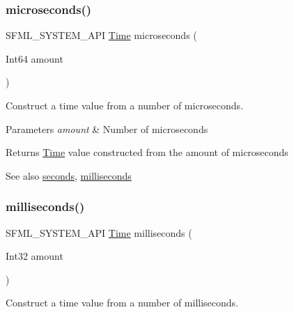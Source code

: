 \subsubsection{\texorpdfstring{microseconds()}{microseconds()}}
{\footnotesize\ttfamily S\+F\+M\+L\+\_\+\+S\+Y\+S\+T\+E\+M\+\_\+\+A\+PI \hyperlink{classsf_1_1_time}{Time} microseconds (\begin{DoxyParamCaption}\item[{Int64}]{amount }\end{DoxyParamCaption})\hspace{0.3cm}{\ttfamily [related]}}



Construct a time value from a number of microseconds. 


\begin{DoxyParams}{Parameters}
{\em amount} & Number of microseconds\\
\hline
\end{DoxyParams}
\begin{DoxyReturn}{Returns}
\hyperlink{classsf_1_1_time}{Time} value constructed from the amount of microseconds
\end{DoxyReturn}
\begin{DoxySeeAlso}{See also}
\hyperlink{classsf_1_1_time_ae36b9ef700f0ed0516abf0194ceb546b}{seconds}, \hyperlink{classsf_1_1_time_ae379d420bc07170668f51522023957b9}{milliseconds} 
\end{DoxySeeAlso}
\mbox{\label{classsf_1_1_time_ae379d420bc07170668f51522023957b9}} 
\subsubsection{\texorpdfstring{milliseconds()}{milliseconds()}}
{\footnotesize\ttfamily S\+F\+M\+L\+\_\+\+S\+Y\+S\+T\+E\+M\+\_\+\+A\+PI \hyperlink{classsf_1_1_time}{Time} milliseconds (\begin{DoxyParamCaption}\item[{Int32}]{amount }\end{DoxyParamCaption})\hspace{0.3cm}{\ttfamily [related]}}



Construct a time value from a number of milliseconds. 


